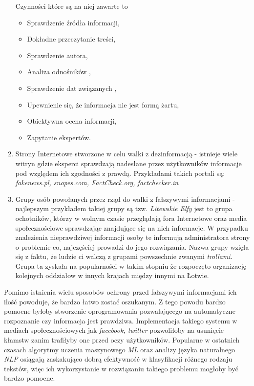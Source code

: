 \begin{enumerate}
    Czynności które są na niej zawarte to 
    \begin{itemize}
        \item Sprawdzenie źródła informacji,
        \item Dokładne przeczytanie treści,
        \item Sprawdzenie autora,
        \item Analiza odnośników ,
        \item Sprawdzenie dat związanych ,
        \item Upewnienie się, że informacja nie jest formą żartu,
        \item Obiektywna ocena informacji,
        \item Zapytanie ekspertów.
    \end{itemize}
    \item Strony Internetowe stworzone w celu walki z dezinformacją - istnieje
    wiele witryn gdzie eksperci sprawdzają nadesłane przez użytkowników informacje
    pod względem ich zgodności z prawdą.
    Przykładami takich portali są: \emph{fakenews.pl, snopes.com, FactCheck.org, factchecker.in} 
    \item Grupy osób powołanych przez rząd do walki z fałszywymi informacjami - najlepszym przykładem
    takiej grupy są tzw. \emph{Litewskie Elfy} jest to grupa ochotników, którzy w wolnym czasie przeglądają 
    fora Internetowe oraz media społecznościowe sprawdzając znajdujące się na nich informacje. W przypadku
    znalezienia nieprawdziwej informacji osoby te informują administratora strony o problemie co, najczęściej
    prowadzi do jego rozwiązania. Nazwa grupy wzięła się z faktu, że ludzie ci walczą z 
    grupami powszechnie zwanymi \emph{trollami}. Grupa ta zyskała na popularności
    w takim stopniu że rozpoczęto organizację kolejnych oddziałow w innych krajach
    między innymi na Łotwie.~\cite{Elves}
\end{enumerate}
Pomimo istnienia wielu sposobów ochrony przed fałszywymi informacjami ich ilość powoduje,
że bardzo łatwo zostać oszukanym. Z tego powodu bardzo pomocne byłoby stworzenie oprogramowania
pozwalającego na automatyczne rozpoznanie czy informacja jest prawdziwa.
Implementacja takiego systemu w mediach społecznościowych jak \emph{facebook, twitter} pozwoliłoby na usunięcie 
kłamstw zanim trafiłyby one przed oczy użytkowników. Popularne w ostatnich czasach algorytmy uczenia
maszynowego \emph{ML} oraz analizy języka naturalnego \emph{NLP} osiągają zaskakująco dobrą 
efektywność w klasyfikacji różnego rodzaju tekstów, więc ich wykorzystanie w rozwiązaniu takiego 
problemu mogłoby być bardzo pomocne.

